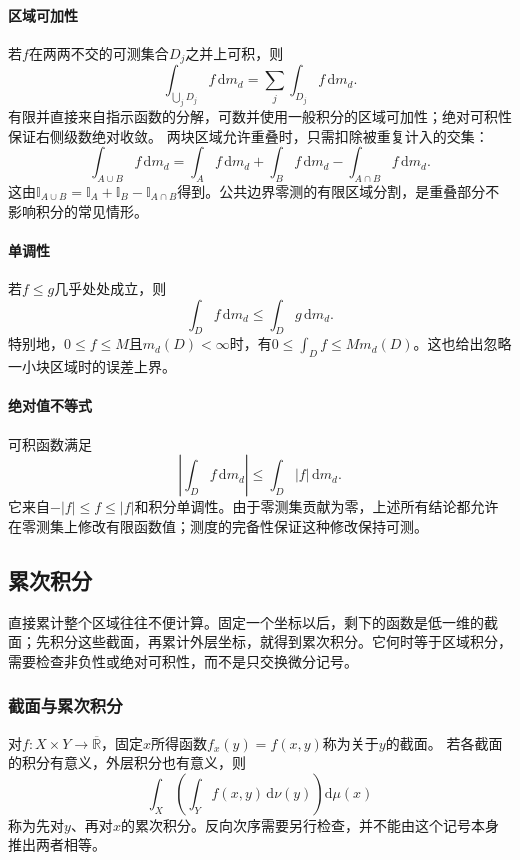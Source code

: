 \paragraph{区域可加性}

若$f$在两两不交的可测集合$D_j$之并上可积，则
\[
 \int_{\bigcup_jD_j}f\,\mathrm dm_d=\sum_j\int_{D_j}f\,\mathrm dm_d.
\]
有限并直接来自指示函数的分解，可数并使用一般积分的区域可加性；绝对可积性保证右侧级数绝对收敛。
两块区域允许重叠时，只需扣除被重复计入的交集：
\[
 \int_{A\cup B}f\,\mathrm dm_d
 =\int_Af\,\mathrm dm_d+\int_Bf\,\mathrm dm_d-\int_{A\cap B}f\,\mathrm dm_d.
\]
这由$\mathbb I_{A\cup B}=\mathbb I_A+\mathbb I_B-\mathbb I_{A\cap B}$得到。公共边界零测的有限区域分割，是重叠部分不影响积分的常见情形。

\paragraph{单调性}

若$f\leq g$几乎处处成立，则
\[
 \int_Df\,\mathrm dm_d\leq\int_Dg\,\mathrm dm_d.
\]
特别地，$0\leq f\leq M$且$m_d(D)<\infty$时，有$0\leq\int_Df\leq M m_d(D)$。这也给出忽略一小块区域时的误差上界。

\paragraph{绝对值不等式}

可积函数满足
\[
 \left|\int_Df\,\mathrm dm_d\right|\leq\int_D|f|\,\mathrm dm_d.
\]
它来自$-|f|\leq f\leq|f|$和积分单调性。由于零测集贡献为零，上述所有结论都允许在零测集上修改有限函数值；测度的完备性保证这种修改保持可测。

\subsection{累次积分}
\label{sec:multivariable-iterated-integrals}

直接累计整个区域往往不便计算。固定一个坐标以后，剩下的函数是低一维的截面；先积分这些截面，再累计外层坐标，就得到累次积分。它何时等于区域积分，需要检查非负性或绝对可积性，而不是只交换微分记号。

\subsubsection{截面与累次积分}

对$f:X\times Y\to\overline{\mathbb R}$，固定$x$所得函数$f_x(y)=f(x,y)$称为关于$y$的截面。
若各截面的积分有意义，外层积分也有意义，则
\[
 \int_X\left(\int_Yf(x,y)\,\mathrm d\nu(y)\right)\mathrm d\mu(x)
\]
称为先对$y$、再对$x$的累次积分。反向次序需要另行检查，并不能由这个记号本身推出两者相等。

